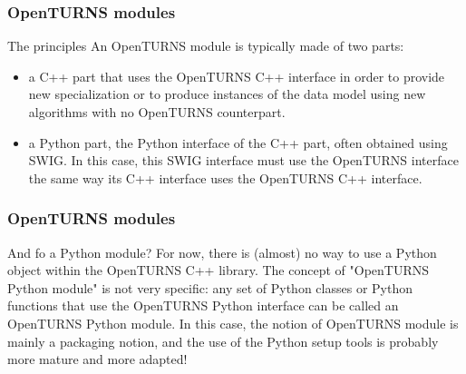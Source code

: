 \documentclass[8pt]{beamer}
\begin{document}
\begin{frame}
  \frametitle{OpenTURNS modules}
  \centering {}
  \begin{block}{The principles}
    An OpenTURNS module is typically made of two parts:
    \begin{itemize}
    \item a C++ part that uses the OpenTURNS C++ interface in order to provide new specialization or to produce instances of the data model using new algorithms with no OpenTURNS counterpart.
    \item a Python part, the Python interface of the C++ part, often obtained using SWIG. In this case, this SWIG interface must use the OpenTURNS interface the same way its C++ interface uses the OpenTURNS C++ interface.
    \end{itemize}
  \end{block}
\end{frame}
\begin{frame}
  \frametitle{OpenTURNS modules}
  \begin{block}{And fo a Python module?}
    For now, there is (almost) no way to use a Python object within the OpenTURNS C++ library. The concept of "OpenTURNS Python module" is not very specific: any set of Python classes or Python functions that use the OpenTURNS Python interface can be called an OpenTURNS Python module. In this case, the notion of OpenTURNS module is mainly a packaging notion, and the use of the Python setup tools is probably more mature and more adapted!
  \end{block}
\end{frame}
\end{document}
